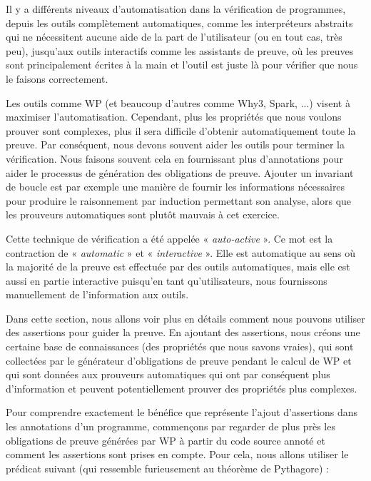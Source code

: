Il y a différents niveaux d'automatisation dans la vérification de programmes,
depuis les outils complètement automatiques, comme les interpréteurs abstraits
qui ne nécessitent aucune aide de la part de l'utilisateur (ou en tout cas, très peu),
jusqu'aux outils interactifs comme les assistants de preuve, où les preuves sont
principalement écrites à la main et l'outil est juste là pour vérifier que nous
le faisons correctement.


Les outils comme WP (et beaucoup d'autres comme Why3, Spark, ...) visent à
maximiser l'automatisation. Cependant, plus les propriétés que nous voulons
prouver sont complexes, plus il sera difficile d'obtenir automatiquement toute
la preuve. Par conséquent, nous devons souvent aider les outils pour terminer
la vérification. Nous faisons souvent cela en fournissant plus d'annotations
pour aider le processus de génération des obligations de preuve. Ajouter un
invariant de boucle est par exemple une manière de fournir les informations
nécessaires pour produire le raisonnement par induction permettant son analyse,
alors que les prouveurs automatiques sont plutôt mauvais à cet exercice.


Cette technique de vérification a été appelée « \textit{auto-active} ». Ce mot est la
contraction de « \textit{automatic} » et « \textit{interactive} ». Elle est automatique au sens
où la majorité de la preuve est effectuée par des outils automatiques, mais
elle est aussi en partie interactive puisqu'en tant qu'utilisateurs, nous
fournissons manuellement de l'information aux outils.


Dans cette section, nous allons voir plus en détails comment nous pouvons
utiliser des assertions pour guider la preuve. En ajoutant des assertions, nous
créons une certaine base de connaissances (des propriétés que nous savons vraies),
qui sont collectées par le générateur d'obligations de preuve pendant le calcul
de WP et qui sont données aux prouveurs automatiques qui ont par conséquent plus
d'information et peuvent potentiellement prouver des propriétés plus complexes.




Pour comprendre exactement le bénéfice que représente l'ajout d'assertions dans
les annotations d'un programme, commençons par regarder de plus près les
obligations de preuve générées par WP à partir du code source annoté et comment
les assertions sont prises en compte. Pour cela, nous allons utiliser le prédicat
suivant (qui ressemble furieusement au théorème de Pythagore) :



